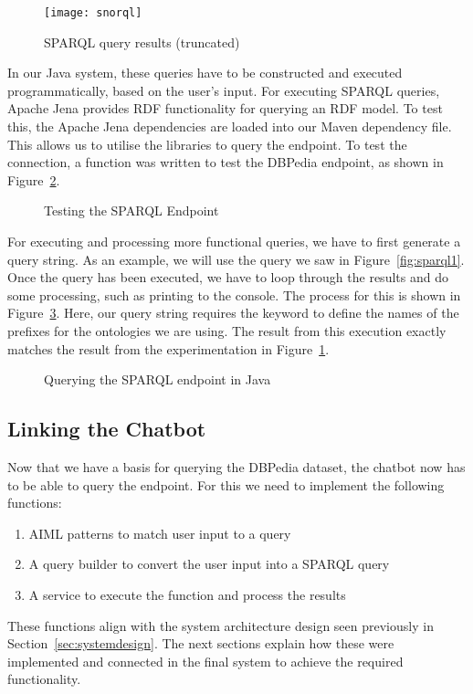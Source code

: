 \begin{figure}[h]
	\centering
	\texttt{[image: snorql]}
	\caption{SPARQL query results (truncated)}
	\label{fig:sparql2}
\end{figure}

In our Java system, these queries have to be constructed and executed programmatically, based on the user's input. For executing SPARQL queries, Apache Jena \cite{apachejena} provides RDF functionality for querying an RDF model. To test this, the Apache Jena dependencies are loaded into our Maven dependency file. This allows us to utilise the  libraries to query the endpoint. To test the connection, a function was written to test the DBPedia endpoint, as shown in Figure~\ref{fig:testrdf}.

\begin{figure}[h]
	\centering
	\qquad
	\caption{Testing the SPARQL Endpoint}
	\label{fig:testrdf}
\end{figure}

For executing and processing more functional queries, we have to first generate a query string. As an example, we will use the query we saw in Figure~\ref{fig:sparql1}. Once the query has been executed, we have to loop through the results and do some processing, such as printing to the console. The process for this is shown in Figure~\ref{fig:querysparql}. Here, our query string requires the  keyword to define the names of the prefixes for the ontologies we are using. The result from this execution exactly matches the result from the experimentation in Figure~\ref{fig:sparql2}.

\begin{figure}[h]
	\centering
	\qquad
	\caption{Querying the SPARQL endpoint in Java}
	\label{fig:querysparql}
\end{figure}

\subsection{Linking the Chatbot}
Now that we have a basis for querying the DBPedia dataset, the chatbot now has to be able to query the endpoint. For this we need to implement the following functions:
\begin{enumerate}
	\item AIML patterns to match user input to a query
	\item A query builder to convert the user input into a SPARQL query
	\item A service to execute the function and process the results
\end{enumerate}
These functions align with the system architecture design seen previously in Section~\ref{sec:systemdesign}. The next sections explain how these were implemented and connected in the final system to achieve the required functionality.

